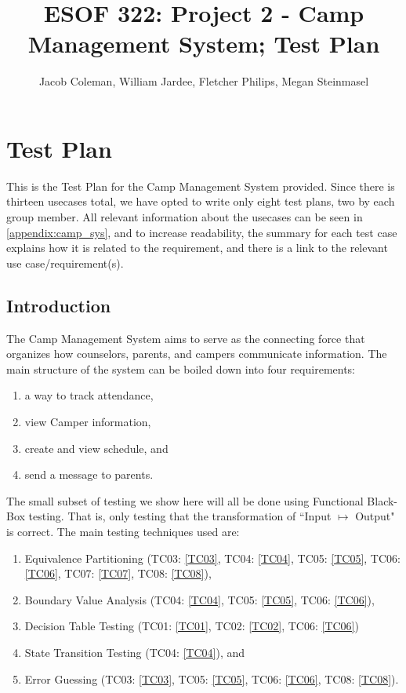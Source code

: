 \documentclass[11pt]{article}
\begin{document}
\title{ESOF 322: Project 2 - Camp Management System; Test Plan}
\author{Jacob Coleman, William Jardee, Fletcher Philips, Megan Steinmasel}
\maketitle




\section*{Test Plan}

This is the Test Plan for the Camp Management System provided. Since there is thirteen usecases total, we have opted to write only eight test plans, two by each group member. All relevant information about the usecases can be seen in \cref{appendix:camp_sys}, and to increase readability, the summary for each test case explains how it is related to the requirement, and there is a link to the relevant use case/requirement(s).

\subsection*{Introduction}
The Camp Management System aims to serve as the connecting force that organizes how counselors, parents, and campers communicate information. The main structure of the system can be boiled down into four requirements:
\begin{enumerate}
	\item a way to track attendance,
	\item view Camper information,
	\item create and view schedule, and
	\item send a message to parents.
\end{enumerate}
The small subset of testing we show here will all be done using Functional Black-Box testing. That is, only testing that the transformation of ``Input $\mapsto$ Output" is correct. The main testing techniques used are:
\begin{enumerate}
	\item Equivalence Partitioning (TC03: \cref{TC03}, TC04: \cref{TC04}, TC05: \cref{TC05}, TC06: \cref{TC06}, TC07: \cref{TC07}, TC08: \cref{TC08}),
	\item Boundary Value Analysis (TC04: \cref{TC04}, TC05: \cref{TC05}, TC06: \cref{TC06}),
	\item Decision Table Testing (TC01: \cref{TC01}, TC02: \cref{TC02}, TC06: \cref{TC06})
	\item State Transition Testing (TC04: \cref{TC04}), and
	\item Error Guessing  (TC03: \cref{TC03}, TC05: \cref{TC05}, TC06: \cref{TC06}, TC08: \cref{TC08}).
\end{enumerate}
\end{document}
